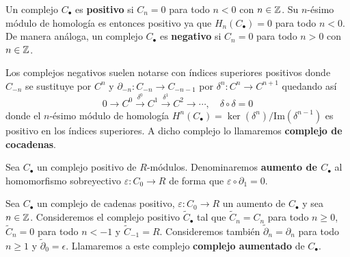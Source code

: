 \begin{definicion}
	Un complejo \(C_{\bullet}\) es \textbf{positivo} si \(C_{n} = 0\) para todo
	\(n < 0\) con \(n \in \mathbb{Z}\). Su \(n\)-ésimo módulo de homología es entonces positivo ya
	que \(H_{n}(C_{\bullet}) = 0\) para todo \(n < 0\). De manera análoga, un complejo
	\(C_{\bullet}\) es \textbf{negativo} si \(C_{n} = 0\) para todo \(n > 0\) con
	\(n \in \mathbb{Z}\).
\end{definicion}

Los complejos negativos suelen notarse con índices superiores positivos donde \(C_{-n}\)
se sustituye por \(C^{n}\) y \(\partial_{-n}: C_{-n}\rightarrow C_{-n-1}\) por \(\delta
^{n}: C^{n} \rightarrow C^{n+1}\) quedando así
\[
0 \to C^{0} \xrightarrow{\delta^0}C^{1} \xrightarrow{\delta^1}C^{2} \to \cdots,
\quad \delta \circ \delta = 0
\]
donde el \(n\)-ésimo módulo de homología \(H^{n}(C_{\bullet}) = \ker(\delta^{n})/\text{Im}
(\delta^{n-1})\) es positivo en los índices superiores. A dicho complejo lo
llamaremos \textbf{complejo de cocadenas}.

\begin{definicion}
	Sea \(C_{\bullet}\) un complejo positivo de \(R\)-módulos. Denominaremos \textbf{aumento
		de \(C_{\bullet}\)} al homomorfismo sobreyectivo \(\varepsilon : C_{0} \to R\) de forma
	que \(\varepsilon \circ \partial_{1} = 0\).
\end{definicion}

\begin{definicion}
	Sea \(C_{\bullet}\) un complejo de cadenas positivo, \(\varepsilon : C_{0} \to R\)
	un aumento de \(C_{\bullet}\) y sea \(n \in \mathbb{Z}\). Consideremos el complejo positivo
	\(\widetilde{C}_{\bullet}\) tal que \(\widetilde{C}_{n} = C_{n}\) para todo \(n \geq
	0\), \(\widetilde{C}_{n} = 0\) para todo \(n < -1\) y \(\widetilde{C}_{-1}=R\). Consideremos
	también \(\widetilde{\partial}_{n} = \partial_{n}\) para todo \(n \geq 1\) y \(\widetilde
	{\partial}_{0}= \epsilon\). Llamaremos a este complejo \textbf{complejo
		aumentado} de \(C_{\bullet}\).
\end{definicion}
%

